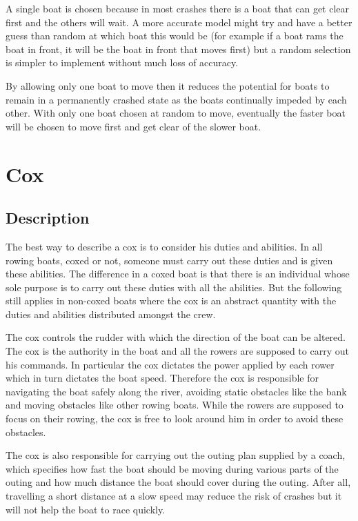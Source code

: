       A single boat is chosen because in most crashes there is a boat that can get clear first and the others will wait. A more accurate model might try and have a better guess than random at which boat this would be (for example if a boat rams the boat in front, it will be the boat in front that moves first) but a random selection is simpler to implement without much loss of accuracy.
      
      By allowing only one boat to move then it reduces the potential for boats to remain in a permanently crashed state as the boats continually impeded by each other. With only one boat chosen at random to move, eventually the faster boat will be chosen to move first and get clear of the slower boat.
      
    \section{Cox}
      \subsection{Description}
      The best way to describe a cox is to consider his duties and abilities. In all rowing boats, coxed or not, someone must carry out these duties and is given these abilities. The difference in a coxed boat is that there is an individual whose sole purpose is to carry out these duties with all the abilities. But the following still applies in non-coxed boats where the cox is an abstract quantity with the duties and abilities distributed amongst the crew.
      
      The cox controls the rudder with which the direction of the boat can be altered. The cox is the authority in the boat and all the rowers are supposed to carry out his commands. In particular the cox dictates the power applied by each rower which in turn dictates the boat speed. Therefore the cox is responsible for navigating the boat safely along the river, avoiding static obstacles like the bank and moving obstacles like other rowing boats. While the rowers are supposed to focus on their rowing, the cox is free to look around him in order to avoid these obstacles. 
      
      The cox is also responsible for carrying out the outing plan supplied by a coach, which specifies how fast the boat should be moving during various parts of the outing and how much distance the boat should cover during the outing. After all, travelling a short distance at a slow speed may reduce the risk of crashes but it will not help the boat to race quickly.
      
